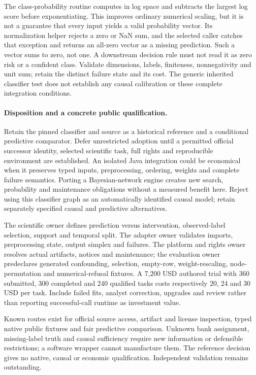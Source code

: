 The class-probability routine computes in log space and subtracts the largest
log score before exponentiating. This improves ordinary numerical scaling,
but it is not a guarantee that every input yields a valid probability vector.
Its normalization helper rejects a zero or NaN sum, and the selected caller
catches that exception and returns an all-zero vector as a missing prediction.
Such a vector sums to zero, not one. A downstream decision rule must not read
it as zero risk or a confident class. Validate dimensions, labels, finiteness,
nonnegativity and unit sum; retain the distinct failure state and its cost.
The generic inherited classifier test does not establish any causal calibration
or these complete integration conditions.~\citep{exec24_weka_source,exec24_weka_choice}

\paragraph{Disposition and a concrete public qualification.}
Retain the pinned classifier and source as a historical reference and a
conditional predictive comparator. Defer unrestricted adoption until a
permitted official successor identity, selected scientific task, full rights
and reproducible environment are established. An isolated Java integration
could be economical when it preserves typed inputs, preprocessing, ordering,
weights and complete failure semantics. Porting a Bayesian-network engine
creates new search, probability and maintenance obligations without a measured
benefit here. Reject using this classifier graph as an automatically identified
causal model; retain separately specified causal and predictive alternatives.
\citep{exec24_weka_choice}

The scientific owner defines prediction versus intervention, observed-label
selection, support and temporal split. The adapter owner validates imports,
preprocessing state, output simplex and failures. The platform and rights owner
resolves actual artifacts, notices and maintenance; the evaluation owner
predeclares generated confounding, selection, empty-row, weight-rescaling,
node-permutation and numerical-refusal fixtures. A 7,200 USD authored trial
with 360 submitted, 300 completed and 240 qualified tasks costs respectively
20, 24 and 30 USD per task. Include failed fits, analyst correction, upgrades
and review rather than reporting successful-call runtime as investment value.
\citep{exec24_weka_choice}

Known routes exist for official source access, artifact and license inspection,
typed native public fixtures and fair predictive comparison. Unknown bank
assignment, missing-label truth and causal sufficiency require new information
or defensible restrictions; a software wrapper cannot manufacture them. The
reference decision gives no native, causal or economic qualification.
Independent validation remains outstanding.


